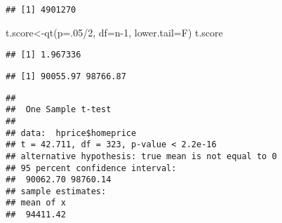 \documentclass[
  12pt,
]{article}
\newenvironment{Shaded}{\begin{snugshade}}{\end{snugshade}}
\newcommand{\AttributeTok}[1]{\textcolor[rgb]{0.77,0.63,0.00}{#1}}
\newcommand{\DecValTok}[1]{\textcolor[rgb]{0.00,0.00,0.81}{#1}}
\newcommand{\FloatTok}[1]{\textcolor[rgb]{0.00,0.00,0.81}{#1}}
\newcommand{\FunctionTok}[1]{\textcolor[rgb]{0.00,0.00,0.00}{#1}}
\newcommand{\NormalTok}[1]{#1}
\newcommand{\OtherTok}[1]{\textcolor[rgb]{0.56,0.35,0.01}{#1}}
\newcommand{\SpecialCharTok}[1]{\textcolor[rgb]{0.00,0.00,0.00}{#1}}
\begin{document}
\begin{verbatim}
## [1] 4901270
\end{verbatim}

\begin{Shaded}
\begin{Highlighting}[]
\NormalTok{t.score}\OtherTok{\textless{}{-}}\FunctionTok{qt}\NormalTok{(}\AttributeTok{p=}\NormalTok{.}\DecValTok{05}\SpecialCharTok{/}\DecValTok{2}\NormalTok{, }\AttributeTok{df=}\NormalTok{n}\DecValTok{{-}1}\NormalTok{, }\AttributeTok{lower.tail=}\NormalTok{F)}
\NormalTok{t.score}
\end{Highlighting}
\end{Shaded}

\begin{verbatim}
## [1] 1.967336
\end{verbatim}

\begin{Shaded}
\end{Shaded}

\begin{verbatim}
## [1] 90055.97 98766.87
\end{verbatim}

\begin{Shaded}
\end{Shaded}

\begin{verbatim}
## 
##  One Sample t-test
## 
## data:  hprice$homeprice
## t = 42.711, df = 323, p-value < 2.2e-16
## alternative hypothesis: true mean is not equal to 0
## 95 percent confidence interval:
##  90062.70 98760.14
## sample estimates:
## mean of x 
##  94411.42
\end{verbatim}
\end{document}
